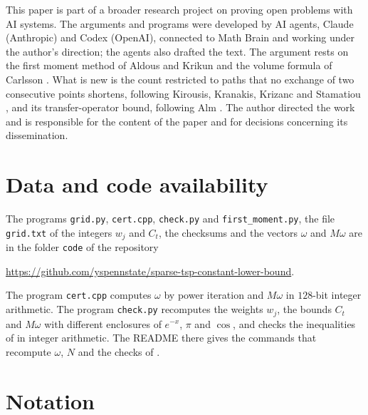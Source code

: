 \documentclass[11pt]{article}
\theoremstyle{remark}
\begin{document}
This paper is part of a broader research project on proving open problems with AI systems.
The arguments and programs were developed by AI agents, Claude (Anthropic) and Codex (OpenAI), connected to Math Brain
and working under the author's direction; the agents also drafted the text. The argument rests on the first moment
method of Aldous and Krikun \cite{AK} and the volume formula of Carlsson \cite[Corollary~8]{Carlsson}. What is new is
the count restricted to paths that no exchange of two consecutive points shortens, following Kirousis, Kranakis,
Krizanc and Stamatiou \cite{KKKS}, and its transfer-operator bound, following Alm \cite{Alm}. The author directed the work and is responsible for the content
of the paper and for decisions concerning its dissemination.

\section*{Data and code availability}

The programs \texttt{grid.py}, \texttt{cert.cpp}, \texttt{check.py} and \texttt{first\_moment.py}, the file \texttt{grid.txt} of the integers $w_j$ and $C_t$,
the checksums and the vectors $\omega$ and $M\omega$ are in the folder \texttt{code} of the repository
\begin{center}\url{https://github.com/yspennstate/sparse-tsp-constant-lower-bound}.\end{center}
The program \texttt{cert.cpp} computes $\omega$ by power iteration and $M\omega$ in $128$-bit integer arithmetic. The program
\texttt{check.py} recomputes the weights $w_j$, the bounds $C_t$ and $M\omega$ with different enclosures of $e^{-x}$, $\pi$
and $\cos$, and checks the inequalities of  in integer arithmetic. The README there gives the
commands that recompute $\omega$, $N$ and the checks of .

\appendix
\section{Notation}\label{app:notation}
\end{document}
